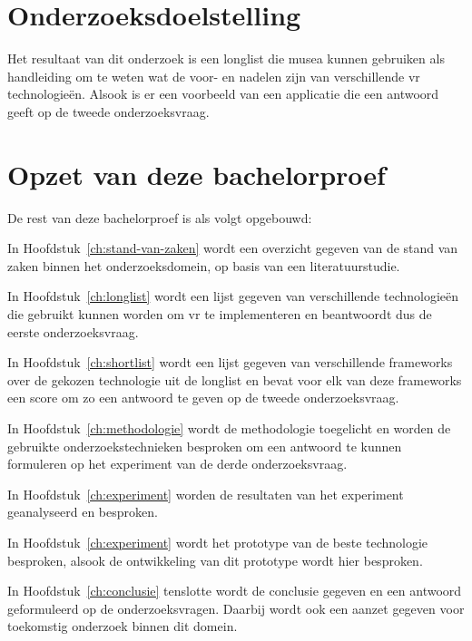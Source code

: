\section{Onderzoeksdoelstelling}
\label{sec:onderzoeksdoelstelling}

Het resultaat van dit onderzoek is een longlist die musea kunnen gebruiken als handleiding om te weten wat de voor- en nadelen zijn van verschillende \acrshort{vr} technologieën. Alsook is er een voorbeeld van een applicatie die een antwoord geeft op de tweede onderzoeksvraag.

\section{Opzet van deze bachelorproef}
\label{sec:opzet-bachelorproef}


De rest van deze bachelorproef is als volgt opgebouwd:

In Hoofdstuk~\ref{ch:stand-van-zaken} wordt een overzicht gegeven van de stand van zaken binnen het onderzoeksdomein, op basis van een literatuurstudie.

In Hoofdstuk~\ref{ch:longlist} wordt een lijst gegeven van verschillende technologieën die gebruikt kunnen worden om \acrshort{vr} te implementeren en beantwoordt dus de eerste onderzoeksvraag.

In Hoofdstuk~\ref{ch:shortlist} wordt een lijst gegeven van verschillende frameworks over de gekozen technologie uit de longlist en bevat voor elk van deze frameworks een score om zo een antwoord te geven op de tweede onderzoeksvraag.

In Hoofdstuk~\ref{ch:methodologie} wordt de methodologie toegelicht en worden de gebruikte onderzoekstechnieken besproken om een antwoord te kunnen formuleren op het experiment van de derde onderzoeksvraag.

In Hoofdstuk~\ref{ch:experiment} worden de resultaten van het experiment geanalyseerd en besproken.

In Hoofdstuk~\ref{ch:experiment} wordt het prototype van de beste technologie besproken, alsook de ontwikkeling van dit prototype wordt hier besproken.

In Hoofdstuk~\ref{ch:conclusie} tenslotte wordt de conclusie gegeven en een antwoord geformuleerd op de onderzoeksvragen. Daarbij wordt ook een aanzet gegeven voor toekomstig onderzoek binnen dit domein.

